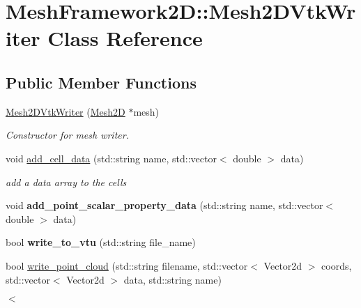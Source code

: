\hypertarget{classMeshFramework2D_1_1Mesh2DVtkWriter}{}\section{Mesh\+Framework2D\+:\+:Mesh2\+D\+Vtk\+Writer Class Reference}
\label{classMeshFramework2D_1_1Mesh2DVtkWriter}
\subsection*{Public Member Functions}
\begin{DoxyCompactItemize}
\item 
\hyperlink{classMeshFramework2D_1_1Mesh2DVtkWriter_a45a63d26a0eb5086bdc5b5ec7bd672d6}{Mesh2\+D\+Vtk\+Writer} (\hyperlink{classMeshFramework2D_1_1Mesh2D}{Mesh2D} $\ast$mesh)
\begin{DoxyCompactList}\small\item\em Constructor for mesh writer. \end{DoxyCompactList}\item 
void \hyperlink{classMeshFramework2D_1_1Mesh2DVtkWriter_ab9efd52aa811ee091d442bf47e6596e0}{add\+\_\+cell\+\_\+data} (std\+::string name, std\+::vector$<$ double $>$ data)
\begin{DoxyCompactList}\small\item\em add a data array to the cells \end{DoxyCompactList}\item 
\mbox{\label{classMeshFramework2D_1_1Mesh2DVtkWriter_acf005302029229aab24af2034524b89e}} 
void {\bfseries add\+\_\+point\+\_\+scalar\+\_\+property\+\_\+data} (std\+::string name, std\+::vector$<$ double $>$ data)
\item 
\mbox{\label{classMeshFramework2D_1_1Mesh2DVtkWriter_af48383d1f8d6f2c5eb33b822f3301ec6}} 
bool {\bfseries write\+\_\+to\+\_\+vtu} (std\+::string file\+\_\+name)
\item 
bool \hyperlink{classMeshFramework2D_1_1Mesh2DVtkWriter_a77fe1b72a7d690335c4b6f485d85dd9c}{write\+\_\+point\+\_\+cloud} (std\+::string filename, std\+::vector$<$ Vector2d $>$ coords, std\+::vector$<$ Vector2d $>$ data, std\+::string name)
\begin{DoxyCompactList}\small\item\em $<$ \end{DoxyCompactList}\item 

\end{DoxyCompactItemize}
